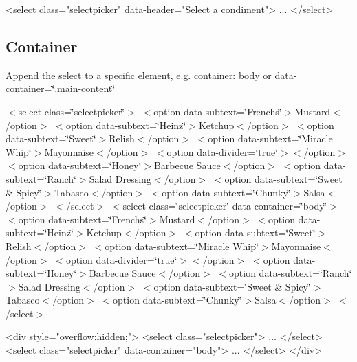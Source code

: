 \begin{DoxyCode}
<select class="selectpicker" data-header="Select a condiment">
  ...
</select>
\end{DoxyCode}


\subsection*{Container}

Append the select to a specific element, e.\+g. {\ttfamily container\+: \textquotesingle{}body\textquotesingle{}} or {\ttfamily data-\/container=\char`\"{}.\+main-\/content\char`\"{}}

  $<$select class=\char`\"{}selectpicker\char`\"{}$>$ $<$option data-\/subtext=\char`\"{}\+French\textquotesingle{}s\char`\"{}$>$Mustard$<$/option$>$ $<$option data-\/subtext=\char`\"{}\+Heinz\char`\"{}$>$Ketchup$<$/option$>$ $<$option data-\/subtext=\char`\"{}\+Sweet\char`\"{}$>$Relish$<$/option$>$ $<$option data-\/subtext=\char`\"{}\+Miracle Whip\char`\"{}$>$Mayonnaise$<$/option$>$ $<$option data-\/divider=\char`\"{}true\char`\"{}$>$$<$/option$>$ $<$option data-\/subtext=\char`\"{}\+Honey\char`\"{}$>$Barbecue Sauce$<$/option$>$ $<$option data-\/subtext=\char`\"{}\+Ranch\char`\"{}$>$Salad Dressing$<$/option$>$ $<$option data-\/subtext=\char`\"{}\+Sweet \& Spicy\char`\"{}$>$Tabasco$<$/option$>$ $<$option data-\/subtext=\char`\"{}\+Chunky\char`\"{}$>$Salsa$<$/option$>$ $<$/select$>$ $<$select class=\char`\"{}selectpicker\char`\"{} data-\/container=\char`\"{}body\char`\"{}$>$ $<$option data-\/subtext=\char`\"{}\+French\textquotesingle{}s\char`\"{}$>$Mustard$<$/option$>$ $<$option data-\/subtext=\char`\"{}\+Heinz\char`\"{}$>$Ketchup$<$/option$>$ $<$option data-\/subtext=\char`\"{}\+Sweet\char`\"{}$>$Relish$<$/option$>$ $<$option data-\/subtext=\char`\"{}\+Miracle Whip\char`\"{}$>$Mayonnaise$<$/option$>$ $<$option data-\/divider=\char`\"{}true\char`\"{}$>$$<$/option$>$ $<$option data-\/subtext=\char`\"{}\+Honey\char`\"{}$>$Barbecue Sauce$<$/option$>$ $<$option data-\/subtext=\char`\"{}\+Ranch\char`\"{}$>$Salad Dressing$<$/option$>$ $<$option data-\/subtext=\char`\"{}\+Sweet \& Spicy\char`\"{}$>$Tabasco$<$/option$>$ $<$option data-\/subtext=\char`\"{}\+Chunky\char`\"{}$>$Salsa$<$/option$>$ $<$/select$>$  


\begin{DoxyCode}
<div style="overflow:hidden;">
  <select class="selectpicker">
    ...
  </select>
  <select class="selectpicker" data-container="body">
    ...
  </select>
</div>
\end{DoxyCode}


